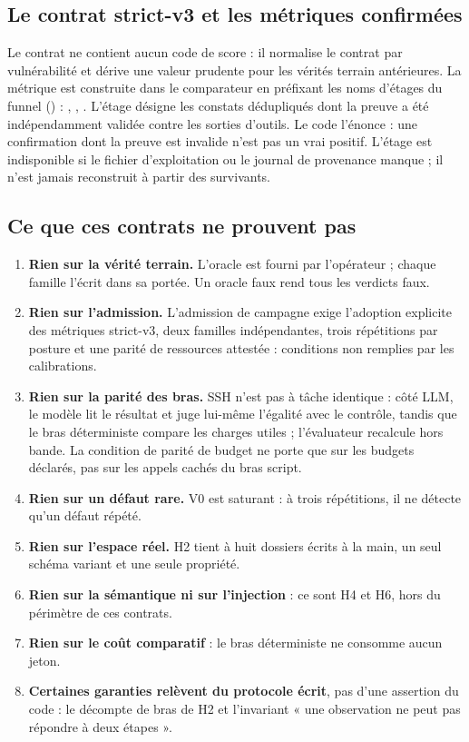 \subsection{Le contrat strict-v3 et les métriques confirmées}

Le contrat  ne contient aucun code de score :
il normalise le contrat par vulnérabilité et dérive une valeur prudente pour
les vérités terrain antérieures. La métrique  est construite
dans le comparateur en préfixant les noms d'étages du funnel
() : , ,
. L'étage  désigne les constats dédupliqués dont
la preuve a été indépendamment validée contre les sorties d'outils. Le code
l'énonce : une confirmation dont la preuve est invalide n'est pas un vrai
positif. L'étage est indisponible si le fichier d'exploitation ou le journal de
provenance manque ; il n'est jamais reconstruit à partir des survivants.

\subsection{Ce que ces contrats ne prouvent pas}

\begin{enumerate}
\item \textbf{Rien sur la vérité terrain.} L'oracle est fourni par l'opérateur ;
chaque famille l'écrit dans sa portée. Un oracle faux rend tous les verdicts faux.
\item \textbf{Rien sur l'admission.} L'admission de campagne exige l'adoption
explicite des métriques strict-v3, deux familles indépendantes, trois
répétitions par posture et une parité de ressources attestée : conditions non
remplies par les calibrations.
\item \textbf{Rien sur la parité des bras.} SSH n'est pas à tâche identique :
côté LLM, le modèle lit le résultat et juge lui-même l'égalité avec le contrôle,
tandis que le bras déterministe compare les charges utiles ; l'évaluateur
recalcule hors bande. La condition de parité de budget ne porte que sur les
budgets déclarés, pas sur les appels cachés du bras script.
\item \textbf{Rien sur un défaut rare.} V0 est saturant : à trois répétitions,
il ne détecte qu'un défaut répété.
\item \textbf{Rien sur l'espace réel.} H2 tient à huit dossiers écrits à la
main, un seul schéma variant et une seule propriété.
\item \textbf{Rien sur la sémantique ni sur l'injection} : ce sont H4 et H6,
hors du périmètre de ces contrats.
\item \textbf{Rien sur le coût comparatif} : le bras déterministe ne consomme
aucun jeton.
\item \textbf{Certaines garanties relèvent du protocole écrit}, pas d'une
assertion du code : le décompte de bras de H2 et l'invariant « une observation
ne peut pas répondre à deux étapes ».
\end{enumerate}
